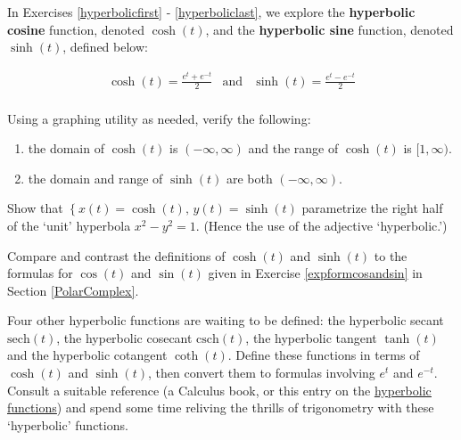 \documentclass{ximera}
\begin{document}
\begin{question}
\label{hyperboliccosinesine} 

In Exercises \ref{hyperbolicfirst} - \ref{hyperboliclast}, we explore the  \textbf{hyperbolic cosine} function, denoted $\cosh(t)$, and the \textbf{hyperbolic sine}
function, denoted $\sinh(t)$, defined below:

\[ \begin{array}{ccc}

\cosh(t) = \frac{e^{t} + e^{-t}}{2} & 
\text{and} & \sinh(t) = \frac{e^{t} - e^{-t}}{2} \\

\end{array} \]

\begin{problem} \label{hyperbolicfirst}

Using a graphing utility as needed, verify the following:  

\begin{enumerate}

\item the domain of $\cosh(t)$ is $(-\infty, \infty)$ and the range of $\cosh(t)$ is $[1,\infty)$.

\item  the domain and range  of $\sinh(t)$ are both $(-\infty, \infty)$.

\end{enumerate}

\end{problem}

\begin{problem} 
Show that $\left\{ x(t) = \cosh(t), \, y(t) = \sinh(t) \right.$ parametrize the right half of the `unit' hyperbola $x^2 - y^2 = 1$.  (Hence the use of the adjective `hyperbolic.')
\end{problem}

\begin{problem}
Compare and contrast the definitions of $\cosh(t)$ and $\sinh(t)$ to the formulas for $\cos(t)$ and $\sin(t)$ given in Exercise \ref{expformcosandsin} in Section \ref{PolarComplex}.
\end{problem}

\begin{problem}\label{andtheresthyperbolic} 
Four other hyperbolic functions are waiting to be defined:  the hyperbolic secant $\text{sech}(t)$, the hyperbolic cosecant $\text{csch}(t)$, the hyperbolic tangent $\tanh(t)$ and the hyperbolic cotangent $\coth(t)$.  Define these functions in terms of $\cosh(t)$ and $\sinh(t)$, then convert them to formulas involving $e^{t}$ and $e^{-t}$.  Consult a suitable reference (a Calculus book, or this entry on the \href{http://en.wikipedia.org/wiki/Hyperbolic_function}{\underline{hyperbolic functions}}) and spend some time reliving the thrills of trigonometry with these `hyperbolic' functions.
\end{problem}


\end{question}
\end{document}
